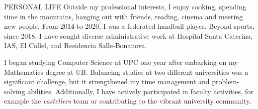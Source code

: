 \documentclass{resume} %
\begin{document}
\begin{rSection}{PERSONAL LIFE}
  Outside my professional interests, I enjoy cooking, spending time in the
  mountains, hanging out with friends, reading, cinema and meeting new
  people. From 2014 to 2020, I was a federated handball player. Beyond
  sports, since 2018, I have sought diverse administrative work at Hospital
  Santa Caterina, IAS, El Collel, and Residencia Salle-Bonanova.

  I began studying Computer Science at UPC one year after embarking on my
  Mathematics degree at UB. Balancing studies at two different universities
  was a significant challenge, but it strengthened my time management and
  problem-solving abilities. Additionally, I have actively participated in
  faculty activities, for example the \emph{castellers} team or
  contributing to the vibrant university community.
\end{rSection}
\end{document}
